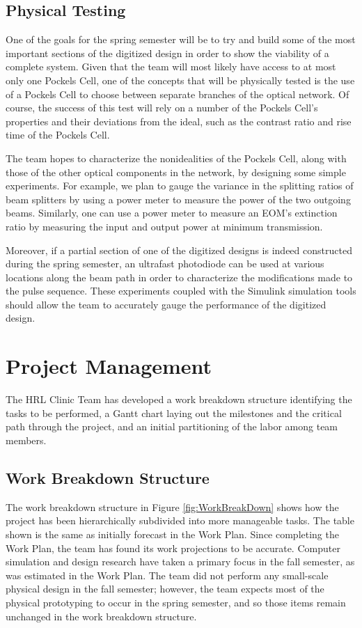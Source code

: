 \documentclass[pdftex,12pt,a4paper]{article}
\begin{document}
\subsection{Physical Testing}

One of the goals for the spring semester will be to try and build some of the most important sections of the digitized design in order to show the viability of a complete system. Given that the team will most likely have access to at most only one Pockels Cell, one of the concepts that will be physically tested is the use of a Pockels Cell to choose between separate branches of the optical network. Of course, the success of this test will rely on a number of the Pockels Cell's properties and their deviations from the ideal, such as the contrast ratio and rise time of the Pockels Cell.     

The team  hopes to characterize the nonidealities of the Pockels Cell, along with those of the other optical components in the network, by designing some simple experiments. For example, we plan to gauge the variance in the splitting ratios of beam splitters by using a power meter to measure the power of the two outgoing beams. Similarly, one can use a power meter to measure an EOM's extinction ratio by measuring the input and output power at minimum transmission.

Moreover, if a partial section of one of the digitized designs is indeed constructed during the spring semester, an ultrafast photodiode can be used at various locations along the beam path in order to characterize the modifications made to the pulse sequence. These experiments coupled with the Simulink simulation tools should allow the team to accurately gauge the performance of the digitized design.


\section{Project Management}
\label{sec:project_managment}
The HRL Clinic Team has developed a work breakdown structure identifying the tasks to be performed, a Gantt chart laying out the milestones and the critical path through the project, and an initial partitioning of the labor among team members. 

\subsection{Work Breakdown Structure}

The work breakdown structure in Figure \ref{fig:WorkBreakDown} shows how the project has been hierarchically subdivided into more manageable tasks. The table shown is the same as initially forecast in the Work Plan. Since completing the Work Plan, the team has found its work projections to be accurate. Computer simulation and design research have taken a primary focus in the fall semester, as was estimated in the Work Plan. The team did not perform any small-scale physical design in the fall semester; however, the team expects most of the physical prototyping to occur in the spring semester, and so those items remain unchanged in the work breakdown structure.
\end{document}
